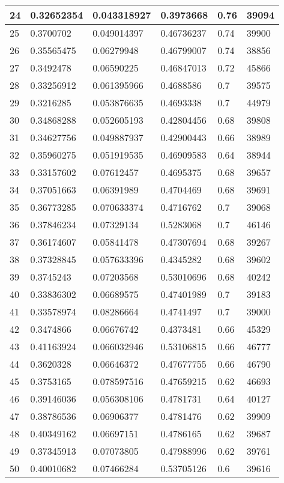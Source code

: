 \begin{longtable}{|l|l|l|l|l|l|}
24 & 0.32652354 & 0.043318927 & 0.3973668 & 0.76 & 39094 \\ \hline 
25 & 0.3700702 & 0.049014397 & 0.46736237 & 0.74 & 39900 \\ \hline 
26 & 0.35565475 & 0.06279948 & 0.46799007 & 0.74 & 38856 \\ \hline 
27 & 0.3492478 & 0.06590225 & 0.46847013 & 0.72 & 45866 \\ \hline 
28 & 0.33256912 & 0.061395966 & 0.4688586 & 0.7 & 39575 \\ \hline 
29 & 0.3216285 & 0.053876635 & 0.4693338 & 0.7 & 44979 \\ \hline 
30 & 0.34868288 & 0.052605193 & 0.42804456 & 0.68 & 39808 \\ \hline 
31 & 0.34627756 & 0.049887937 & 0.42900443 & 0.66 & 38989 \\ \hline 
32 & 0.35960275 & 0.051919535 & 0.46909583 & 0.64 & 38944 \\ \hline 
33 & 0.33157602 & 0.07612457 & 0.4695375 & 0.68 & 39657 \\ \hline 
34 & 0.37051663 & 0.06391989 & 0.4704469 & 0.68 & 39691 \\ \hline 
35 & 0.36773285 & 0.070633374 & 0.4716762 & 0.7 & 39068 \\ \hline 
36 & 0.37846234 & 0.07329134 & 0.5283068 & 0.7 & 46146 \\ \hline 
37 & 0.36174607 & 0.05841478 & 0.47307694 & 0.68 & 39267 \\ \hline 
38 & 0.37328845 & 0.057633396 & 0.4345282 & 0.68 & 39602 \\ \hline 
39 & 0.3745243 & 0.07203568 & 0.53010696 & 0.68 & 40242 \\ \hline 
40 & 0.33836302 & 0.06689575 & 0.47401989 & 0.7 & 39183 \\ \hline 
41 & 0.33578974 & 0.08286664 & 0.4741497 & 0.7 & 39000 \\ \hline 
42 & 0.3474866 & 0.06676742 & 0.4373481 & 0.66 & 45329 \\ \hline 
43 & 0.41163924 & 0.066032946 & 0.53106815 & 0.66 & 46777 \\ \hline 
44 & 0.3620328 & 0.06646372 & 0.47677755 & 0.66 & 46790 \\ \hline 
45 & 0.3753165 & 0.078597516 & 0.47659215 & 0.62 & 46693 \\ \hline 
46 & 0.39146036 & 0.056308106 & 0.4781731 & 0.64 & 40127 \\ \hline 
47 & 0.38786536 & 0.06906377 & 0.4781476 & 0.62 & 39909 \\ \hline 
48 & 0.40349162 & 0.06697151 & 0.4786165 & 0.62 & 39687 \\ \hline 
49 & 0.37345913 & 0.07073805 & 0.47988996 & 0.62 & 39761 \\ \hline 
50 & 0.40010682 & 0.07466284 & 0.53705126 & 0.6 & 39616 \\ \hline 
\end{longtable}